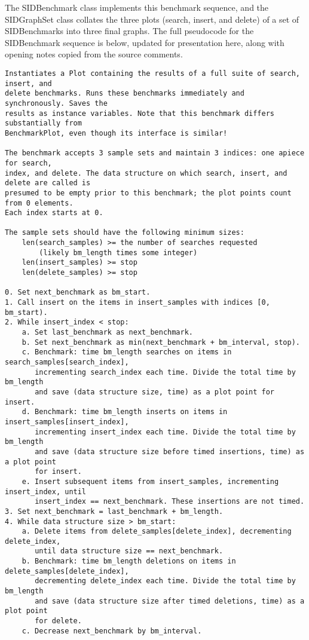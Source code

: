 \documentclass{article}
\begin{document}
The SIDBenchmark class implements this benchmark sequence, and the SIDGraphSet class collates the three plots (search, insert, and delete) of a set of SIDBenchmarks into three final graphs. The full pseudocode for the SIDBenchmark sequence is below, updated for presentation here, along with opening notes copied from the source comments.

\begin{Verbatim}
Instantiates a Plot containing the results of a full suite of search, insert, and
delete benchmarks. Runs these benchmarks immediately and synchronously. Saves the
results as instance variables. Note that this benchmark differs substantially from
BenchmarkPlot, even though its interface is similar!

The benchmark accepts 3 sample sets and maintain 3 indices: one apiece for search,
index, and delete. The data structure on which search, insert, and delete are called is
presumed to be empty prior to this benchmark; the plot points count from 0 elements.
Each index starts at 0.

The sample sets should have the following minimum sizes:
    len(search_samples) >= the number of searches requested 
        (likely bm_length times some integer)
    len(insert_samples) >= stop
    len(delete_samples) >= stop

0. Set next_benchmark as bm_start.
1. Call insert on the items in insert_samples with indices [0, bm_start).
2. While insert_index < stop:
    a. Set last_benchmark as next_benchmark.
    b. Set next_benchmark as min(next_benchmark + bm_interval, stop).
    c. Benchmark: time bm_length searches on items in search_samples[search_index],
       incrementing search_index each time. Divide the total time by bm_length 
       and save (data structure size, time) as a plot point for insert.
    d. Benchmark: time bm_length inserts on items in insert_samples[insert_index],
       incrementing insert_index each time. Divide the total time by bm_length 
       and save (data structure size before timed insertions, time) as a plot point
       for insert.
    e. Insert subsequent items from insert_samples, incrementing insert_index, until
       insert_index == next_benchmark. These insertions are not timed.
3. Set next_benchmark = last_benchmark + bm_length.
4. While data structure size > bm_start:
    a. Delete items from delete_samples[delete_index], decrementing delete_index,
       until data structure size == next_benchmark.
    b. Benchmark: time bm_length deletions on items in delete_samples[delete_index],
       decrementing delete_index each time. Divide the total time by bm_length 
       and save (data structure size after timed deletions, time) as a plot point
       for delete.
    c. Decrease next_benchmark by bm_interval.
\end{Verbatim}
\end{document}
